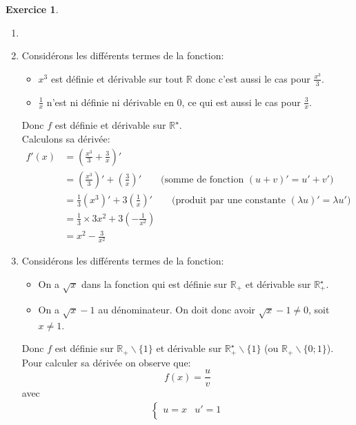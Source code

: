 \documentclass{exam}
\theoremstyle{definition}
\newtheorem{exercice}{Exercice}
\begin{document}
\begin{exercice}
    \begin{enumerate}
        \item[]
        \item Considérons les différents termes de la fonction:
        \begin{itemize}
            \item $x^3$ est définie et dérivable sur tout $\mathbb{R}$ donc c'est aussi le cas pour $\frac{x^3}{3}$.
            \item $\frac{1}{x}$ n'est ni définie ni dérivable en $0$, ce qui est aussi le cas pour $\frac{3}{x}$.
        \end{itemize}
        Donc $f$ est définie et dérivable sur $\mathbb{R}^\star$.\\
        Calculons sa dérivée:
        \begin{align*}
            f'(x) &= \left(\frac{x^3}{3} + \frac{3}{x}\right)'\\
            &= \left(\frac{x^3}{3}\right)' + \left(\frac{3}{x}\right)' \qquad \text{(somme de fonction $(u+v)' = u' + v'$)}\\
            &= \frac{1}{3}\left(x^3\right)' + 3\left(\frac{1}{x}\right)' \qquad \text{(produit par une constante $(\lambda u)' = \lambda u')$}\\
            &= \frac{1}{3}\times 3x^2 + 3 \left(-\frac{1}{x^2}\right)\\
            &= x^2 - \frac{3}{x^2}
        \end{align*}
        \item Considérons les différents termes de la fonction:
        \begin{itemize}
            \item On a $\sqrt{x}$ dans la fonction qui est définie sur $\mathbb{R}_+$ et dérivable sur $\mathbb{R}_+^\star$.
            \item On a $\sqrt{x} - 1$ au dénominateur. On doit donc avoir $\sqrt{x} - 1 \neq 0$, soit $x \neq 1$.
        \end{itemize}
        Donc $f$ est définie sur $\mathbb{R}_+ \backslash \{ 1 \}$ et dérivable sur $\mathbb{R}_+^\star \backslash \{ 1 \}$ (ou $\mathbb{R}_+ \backslash \{ 0; 1 \}$).\\
        Pour calculer sa dérivée on observe que:
        $$
        f(x) = \frac{u}{v}
        $$
        avec
        \begin{align*}
        \begin{cases}
            u = x & u' = 1\\

\end{cases}
\end{align*}
\end{enumerate}
\end{exercice}
\end{document}
